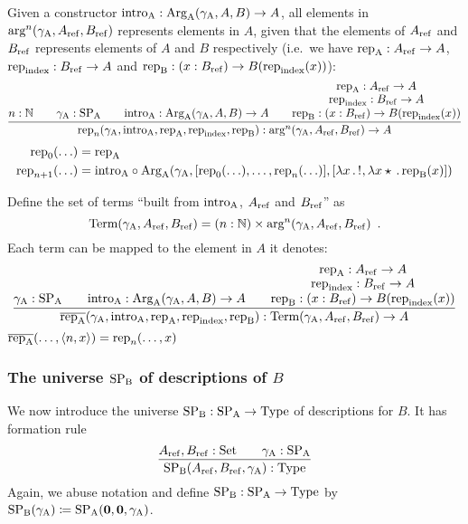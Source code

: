 \documentclass{article}
\begin{document}

Given a constructor $\text{intro}_{\mathrm{A}} : \text{Arg}_{\mathrm{A}}(\gamma_{\mathrm{A}}, A, B) \to A$, all
elements in $\text{arg}^{n}(\gamma_{\mathrm{A}},A_{\mathrm{ref}}, B_{\mathrm{ref}})$ represents elements in
$A$, given that the elements of $A_{\mathrm{ref}}$ and $B_{\mathrm{ref}}$ represents elements
of $A$ and $B$ respectively (i.e.\ we have $\text{rep}_{\mathrm{A}} : A_{\mathrm{ref}} \to A$,
$\text{rep}_{\mathrm{index}} : B_{\mathrm{ref}} \to A$ and $\text{rep}_{\mathrm{B}} : (x : B_{\mathrm{ref}}) \to
B(\text{rep}_{\mathrm{index}}(x))$):
%
\[
\infer{\repn{n}(\gammaA, \introA, \repA, \repIndex, \repB) : \argn{n}(\gammaA, \Aref, \Bref) \to A}
      {n : \Nat & \quad
       \gammaA : \SPA & \quad
       \introA : \ArgA(\gammaA, A, B) \to A & \quad
       \deduce{\repB : (x : \Bref) \to B(\repIndex(x))}
              {\deduce{\repIndex : \Bref \to A}
                      {\repA : \Aref \to A}}}
\]
%
\begin{align*}
\text{rep}_{0}(\ldots) &= \text{rep}_{\mathrm{A}} \\
\text{rep}_{n + 1}(\ldots) &= \text{intro}_{\mathrm{A}} \circ \text{Arg}_{\mathrm{A}}(\gamma_{\mathrm{A}}, [\text{rep}_{0}(\ldots), \ldots, \text{rep}_{n}(\ldots)], [\lambda x\,.\,!_{}, \lambda x \star\,.\,\text{rep}_{\mathrm{B}}(x)])
\end{align*}


Define the set of terms ``built from $\text{intro}_{\mathrm{A}}$, $A_{\mathrm{ref}}$ and  $B_{\mathrm{ref}}$'' as
%
\[
\text{Term}(\gamma_{\mathrm{A}}, A_{\mathrm{ref}}, B_{\mathrm{ref}}) = (n : \mathbb{N}) \times \text{arg}^{n}(\gamma_{\mathrm{A}}, A_{\mathrm{ref}}, B_{\mathrm{ref}}) \enspace .
\]
%
Each term can be mapped to the element in $A$ it denotes:
%
\[
\infer{\repbar(\gammaA, \introA, \repA, \repIndex, \repB) : \Aterm(\gammaA, \Aref, \Bref) \to A}
      {\gammaA : \SPA & \quad
       \introA : \ArgA(\gammaA, A, B) \to A & \quad
       \deduce{\repB : (x : \Bref) \to B(\repIndex(x))}
              {\deduce{\repIndex : \Bref \to A}
                      {\repA : \Aref \to A}}}
\]
%
$\overline{\text{rep}_{\mathrm{A}}}(\ldots, \langle n , x\rangle) = \text{rep}_{n}(\ldots, x)$


\subsubsection{The universe $\text{SP}_{\mathrm{B}}$ of descriptions of $B$}
\label{sec:SPB}

We now introduce the universe $\text{SP}_{\mathrm{B}} : \text{SP}_{\mathrm{A}} \to \text{Type}$ of descriptions
for $B$. It has formation rule
%
\[
\infer{\SPB(\Aref, \Bref, \gammaA) : \TYPE}{\Aref, \Bref : \Set & \quad \gammaA : \SPA}
\]
%
Again, we abuse notation and define $\text{SP}_{\mathrm{B}} : \text{SP}_{\mathrm{A}} \to \text{Type}$ by
$\text{SP}_{\mathrm{B}}(\gamma_{\mathrm{A}}) \coloneqq \text{SP}_{\mathrm{A}}(\mathbf{0}, \mathbf{0}, \gamma_{\mathrm{A}})$.
\end{document}
